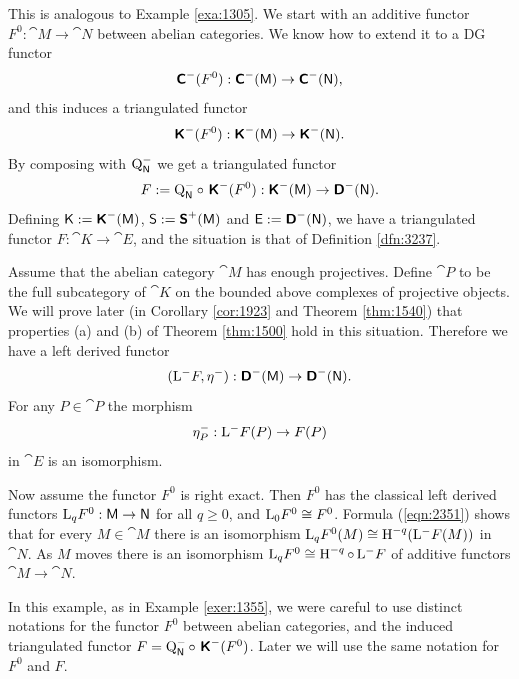 \begin{exa} \label{exa:1501}
This is analogous to Example \ref{exa:1305}.
We start with an additive functor 
$F^0 : \cat{M} \to \cat{N}$ between abelian categories. We know how to extend 
it 
to a DG functor 
\[ \operatorname{\boldsymbol{\mathsf{C}}}^{-}(F^0) : \operatorname{\boldsymbol{\mathsf{C}}}^{-}(\operatorname{\mathsf{M}}) \to \operatorname{\boldsymbol{\mathsf{C}}}^{-}(\operatorname{\mathsf{N}}) , \]
and this induces a triangulated functor 
\[ \operatorname{\boldsymbol{\mathsf{K}}}^{-}(F^0) : \operatorname{\boldsymbol{\mathsf{K}}}^{-}(\operatorname{\mathsf{M}}) \to  \operatorname{\boldsymbol{\mathsf{K}}}^{-}(\operatorname{\mathsf{N}}) . \]
By composing with $\operatorname{Q}^-_{\operatorname{\mathsf{N}}}$ we get a triangulated functor
\begin{equation} \label{eqn:5032}
F := \operatorname{Q}^-_{\operatorname{\mathsf{N}}} \circ \, \operatorname{\boldsymbol{\mathsf{K}}}^{-}(F^0) : \operatorname{\boldsymbol{\mathsf{K}}}^{-}(\operatorname{\mathsf{M}}) 
\to \operatorname{\boldsymbol{\mathsf{D}}}^{-}(\operatorname{\mathsf{N}}) . 
\end{equation}
Defining $\operatorname{\mathsf{K}} := \operatorname{\boldsymbol{\mathsf{K}}}^{-}(\operatorname{\mathsf{M}})$,
$\operatorname{\mathsf{S}} := \operatorname{\boldsymbol{\mathsf{S}}}^{+}(\operatorname{\mathsf{M}})$ and 
$\operatorname{\mathsf{E}} := \operatorname{\boldsymbol{\mathsf{D}}}^{-}(\operatorname{\mathsf{N}})$,
we have a triangulated functor 
$F : \cat{K} \to \cat{E}$, and the situation is that of Definition 
\ref{dfn:3237}.

Assume that the abelian category $\cat{M}$ has enough projectives. 
Define $\cat{P}$ to be the full subcategory of $\cat{K}$ on the bounded above 
complexes of projective objects. 
We will prove later (in Corollary \ref{cor:1923}  and Theorem \ref{thm:1540}) 
that properties (a) and (b) of Theorem \ref{thm:1500} hold 
in this situation. Therefore we have a left derived functor
\begin{equation} \label{eqn:5033}
(\mathrm{L}^- F, \eta^-) : \operatorname{\boldsymbol{\mathsf{D}}}^{-}(\operatorname{\mathsf{M}}) \to \operatorname{\boldsymbol{\mathsf{D}}}^{-}(\operatorname{\mathsf{N}}) . 
\end{equation}
For any $P \in \cat{P}$ the morphism 
\begin{equation} \label{eqn:2351}
\eta^-_P : \mathrm{L}^- F(P) \to F(P) 
\end{equation}
in $\cat{E}$ is an isomorphism. 

Now assume the functor $F^0$ is right exact. Then $F^0$ has the classical 
left derived functors 
$\mathrm{L}_q F^0 : \operatorname{\mathsf{M}} \to \operatorname{\mathsf{N}}$
for all $q \geq 0$, and $\mathrm{L}_0 F^0 \cong F^0$. Formula (\ref{eqn:2351}) 
shows that for every $M \in \cat{M}$ there is an isomorphism 
$\mathrm{L}_q F^0(M) \cong \operatorname{H}^{-q}(\mathrm{L}^- F(M))$
in $\cat{N}$. As $M$ moves there is an isomorphism  
$\mathrm{L}_q F^0 \cong \operatorname{H}^{-q} \circ \, \mathrm{L}^- F$
of additive functors $\cat{M} \to \cat{N}$.

In this example, as in Example \ref{exer:1355}, we were careful to use 
distinct notations for the functor 
$F^0$ between abelian categories, and the induced triangulated functor 
$F = \operatorname{Q}^-_{\operatorname{\mathsf{N}}} \circ \, \operatorname{\boldsymbol{\mathsf{K}}}^{-}(F^0)$.
Later we will use the same notation for $F^0$ and $F$. 
\end{exa}

